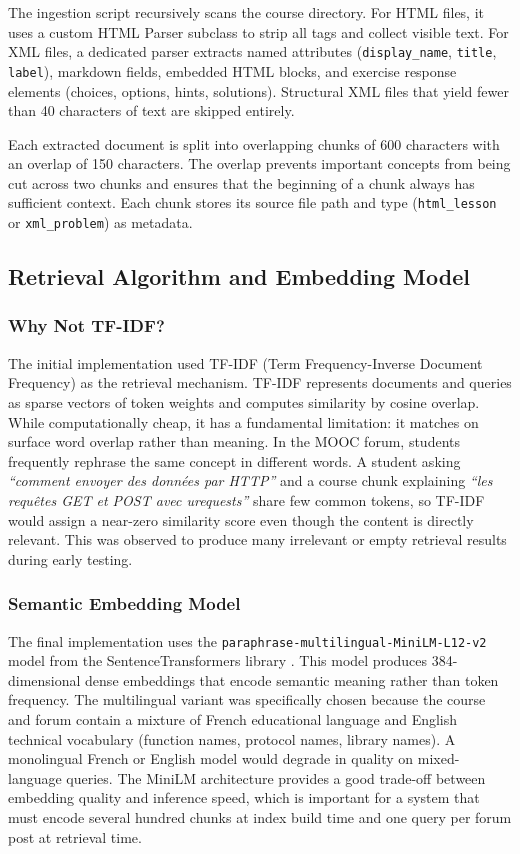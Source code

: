 \documentclass[12pt, a4paper]{article}
\begin{document}
The ingestion script recursively scans the course directory. For HTML files, it uses a custom HTML Parser subclass to strip all tags and collect visible text. For XML files, a dedicated parser extracts named attributes (\texttt{display\_name}, \texttt{title}, \texttt{label}), markdown fields, embedded HTML blocks, and exercise response elements (choices, options, hints, solutions). Structural XML files that yield fewer than 40 characters of text are skipped entirely.

Each extracted document is split into overlapping chunks of 600 characters with an overlap of 150 characters. The overlap prevents important concepts from being cut across two chunks and ensures that the beginning of a chunk always has sufficient context. Each chunk stores its source file path and type (\texttt{html\_lesson} or \texttt{xml\_problem}) as metadata.

\subsection{Retrieval Algorithm and Embedding Model}

\subsubsection{Why Not TF-IDF?}

The initial implementation used TF-IDF (Term Frequency-Inverse Document Frequency) as the retrieval mechanism. TF-IDF represents documents and queries as sparse vectors of token weights and computes similarity by cosine overlap. While computationally cheap, it has a fundamental limitation: it matches on surface word overlap rather than meaning. In the MOOC forum, students frequently rephrase the same concept in different words. A student asking \textit{``comment envoyer des données par HTTP''} and a course chunk explaining \textit{``les requêtes GET et POST avec urequests''} share few common tokens, so TF-IDF would assign a near-zero similarity score even though the content is directly relevant. This was observed to produce many irrelevant or empty retrieval results during early testing.

\subsubsection{Semantic Embedding Model}

The final implementation uses the \texttt{paraphrase-multilingual-MiniLM-L12-v2} model \cite{reimers2020multilingual} from the SentenceTransformers library \cite{reimers2020multilingual}. This model produces 384-dimensional dense embeddings that encode semantic meaning rather than token frequency. The multilingual variant was specifically chosen because the course and forum contain a mixture of French educational language and English technical vocabulary (function names, protocol names, library names). A monolingual French or English model would degrade in quality on mixed-language queries. The MiniLM architecture provides a good trade-off between embedding quality and inference speed, which is important for a system that must encode several hundred chunks at index build time and one query per forum post at retrieval time.
\end{document}
